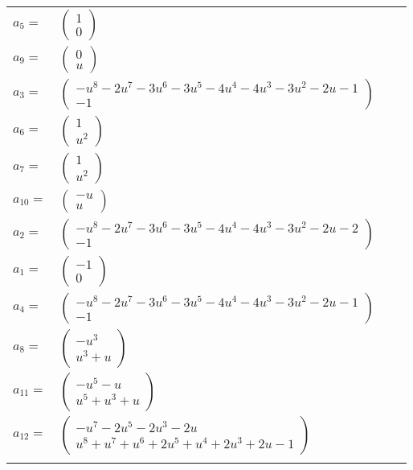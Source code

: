\documentclass[1p]{elsarticle_modified}
\theoremstyle{definition}
\begin{document}
\begin{tabular}{m{7pt} m{180pt} m{7pt} m{180pt} }
\flushright $a_{5}=$&$\begin{pmatrix}1\\0\end{pmatrix}$ \\
\flushright $a_{9}=$&$\begin{pmatrix}0\\u\end{pmatrix}$ \\
\flushright $a_{3}=$&$\begin{pmatrix}- u^8-2 u^7-3 u^6-3 u^5-4 u^4-4 u^3-3 u^2-2 u-1\\-1\end{pmatrix}$ \\
\flushright $a_{6}=$&$\begin{pmatrix}1\\u^2\end{pmatrix}$ \\
\flushright $a_{7}=$&$\begin{pmatrix}1\\u^2\end{pmatrix}$ \\
\flushright $a_{10}=$&$\begin{pmatrix}- u\\u\end{pmatrix}$ \\
\flushright $a_{2}=$&$\begin{pmatrix}- u^8-2 u^7-3 u^6-3 u^5-4 u^4-4 u^3-3 u^2-2 u-2\\-1\end{pmatrix}$ \\
\flushright $a_{1}=$&$\begin{pmatrix}-1\\0\end{pmatrix}$ \\
\flushright $a_{4}=$&$\begin{pmatrix}- u^8-2 u^7-3 u^6-3 u^5-4 u^4-4 u^3-3 u^2-2 u-1\\-1\end{pmatrix}$ \\
\flushright $a_{8}=$&$\begin{pmatrix}- u^3\\u^3+u\end{pmatrix}$ \\
\flushright $a_{11}=$&$\begin{pmatrix}- u^5- u\\u^5+u^3+u\end{pmatrix}$ \\
\flushright $a_{12}=$&$\begin{pmatrix}- u^7-2 u^5-2 u^3-2 u\\u^8+u^7+u^6+2 u^5+u^4+2 u^3+2 u-1\end{pmatrix}$\\&\end{tabular}
\end{document}

